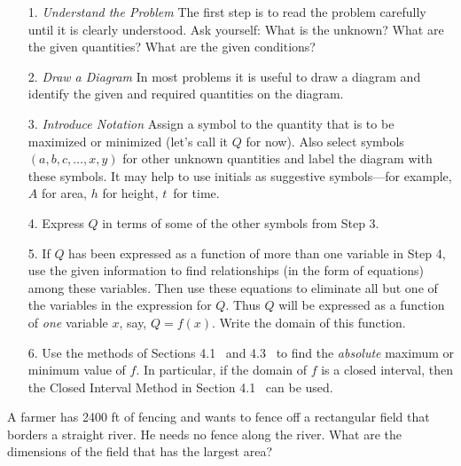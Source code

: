 \documentclass{sebase}
\begin{document}
\begin{enumerate}
\item[1.] \textit{Understand the Problem}%
\enskip%
The first step is to read the problem carefully until it is clearly
understood. Ask yourself: What is the unknown? What are the given
quantities? What are the given conditions?

\item[2.] \textit{Draw a Diagram}%
\enskip%
In most problems it is useful to draw a diagram and identify the given and
required quantities on the diagram.

\item[3.] \textit{Introduce Notation}%
\enskip%
Assign a symbol to the quantity that is to be maximized or minimized (let's
call it $Q$ for now). Also select symbols $(a,b,c,\ldots ,x,y)$ for other
unknown quantities and label the diagram with these symbols. It may help to
use initials as suggestive symbols---for example, $A$ for area, $h$ for
height, $t$~for time.

\item[4.] Express $Q$ in terms of some of the other symbols from Step 3.

\item[5.] If $Q$ has been expressed as a function of more than one variable
in Step 4, use the given information to find relationships (in the form of
equations) among these variables. Then use these equations to eliminate all
but one of the variables in the expression for $Q$. Thus $Q$ will be
expressed as a function of \textit{one} variable $x$, say, $Q=f(x)$. Write
the domain of this function.

\item[6.] Use the methods of Sections 
4.1%
\ and 
4.3%
\ to find the \textit{absolute} maximum or minimum value of $f$. In
particular, if the domain of $f$ is a closed interval, then the Closed
Interval Method in Section 
4.1%
\ can be used.
\end{enumerate}

\begin{Example}[1]
A farmer has 2400 ft of fencing and wants to fence off a rectangular field
that borders a straight river. He needs no fence along the river. What are
the dimensions of the field that has the largest area?
\end{Example}
\end{document}
